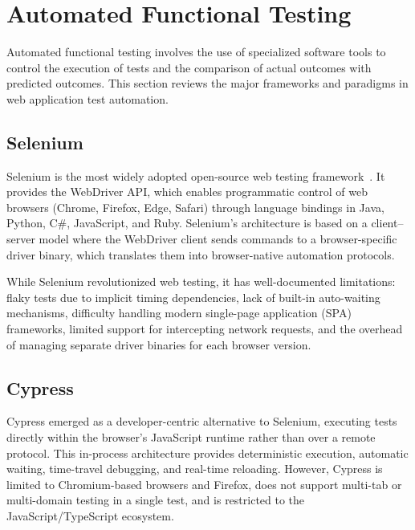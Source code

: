 \section{Automated Functional Testing}
\label{sec:automated_testing}

Automated functional testing involves the use of specialized software
tools to control the execution of tests and the comparison of actual
outcomes with predicted outcomes. This section reviews the major
frameworks and paradigms in web application test automation.

\subsection{Selenium}
\label{subsec:selenium}

Selenium is the most widely adopted open-source web testing
framework~\cite{selenium2004}. It provides the WebDriver API, which
enables programmatic control of web browsers (Chrome, Firefox, Edge,
Safari) through language bindings in Java, Python, C\#, JavaScript,
and Ruby. Selenium's architecture is based on a client--server model
where the WebDriver client sends commands to a browser-specific driver
binary, which translates them into browser-native automation protocols.

While Selenium revolutionized web testing, it has well-documented
limitations: flaky tests due to implicit timing dependencies, lack of
built-in auto-waiting mechanisms, difficulty handling modern single-page
application (SPA) frameworks, limited support for intercepting network
requests, and the overhead of managing separate driver binaries for each
browser version.

\subsection{Cypress}
\label{subsec:cypress}

Cypress emerged as a developer-centric alternative to Selenium,
executing tests directly within the browser's JavaScript runtime rather
than over a remote protocol. This in-process architecture provides
deterministic execution, automatic waiting, time-travel debugging, and
real-time reloading. However, Cypress is limited to Chromium-based
browsers and Firefox, does not support multi-tab or multi-domain testing
in a single test, and is restricted to the JavaScript/TypeScript
ecosystem.

